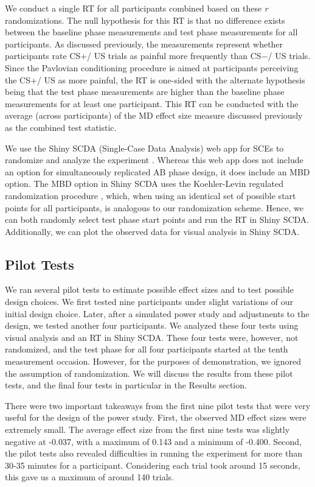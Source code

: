\documentclass{jote-article}
\begin{document}
We conduct a single RT for all participants combined based on these \emph{r} randomizations. The null hypothesis for this RT is that no difference exists between the baseline phase measurements and test phase measurements for all participants. As discussed previously, the measurements represent whether participants rate CS+/ US trials as painful more frequently than CS−/ US trials. Since the Pavlovian conditioning procedure is aimed at participants perceiving the CS+/ US as more painful, the RT is one-sided with the alternate hypothesis being that the test phase measurements are higher than the baseline phase measurements for at least one participant. This RT can be conducted with the average (across participants) of the MD effect size measure discussed previously as the combined test statistic.

We use the Shiny SCDA (Single-Case Data Analysis) web app for SCEs to randomize and analyze the experiment \cite{bibr47}. Whereas this web app does not include an option for simultaneously replicated AB phase design, it does include an MBD option. The MBD option in Shiny SCDA uses the Koehler-Levin regulated randomization procedure \cite{bibr48}, which, when using an identical set of possible start points for all participants, is analogous to our randomization scheme. Hence, we can both randomly select test phase start points and run the RT in Shiny SCDA. Additionally, we can plot the observed data for visual analysis in Shiny SCDA.

\subsection{Pilot Tests}

We ran several pilot tests to estimate possible effect sizes and to test possible design choices. We first tested nine participants under slight variations of our initial design choice. Later, after a simulated power study and adjustments to the design, we tested another four participants. We analyzed these four tests using visual analysis and an RT in Shiny SCDA. These four tests were, however, not randomized, and the test phase for all four participants started at the tenth measurement occasion. However, for the purposes of demonstration, we ignored the assumption of randomization. We will discuss the results from these pilot tests, and the final four tests in particular in the Results section.

There were two important takeaways from the first nine pilot tests that were very useful for the design of the power study. First, the observed MD effect sizes were extremely small. The average effect size from the first nine tests was slightly negative at -0.037, with a maximum of 0.143 and a minimum of -0.400. Second, the pilot tests also revealed difficulties in running the experiment for more than 30-35 minutes for a participant. Considering each trial took around 15 seconds, this gave us a maximum of around 140 trials.
\end{document}
